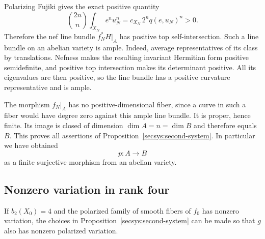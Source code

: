 Polarizing Fujiki gives the exact positive quantity
\begin{equation}\label{secsys:mixed-fujiki}
 \binom{2n}{n}\int_{X_N}e^n u_N^n
       =c_{X_N}\,2^n q(e,u_N)^n>0.
\end{equation}
Therefore the nef line bundle $f_N^*H|_A$ has positive top
self-intersection.  Such a line bundle on an abelian variety is ample.
Indeed, average representatives of its class by translations.  Nefness
makes the resulting invariant Hermitian form positive semidefinite,
and positive top intersection makes its determinant positive.  All
its eigenvalues are then positive, so the line bundle has a positive
curvature representative and is ample.

The morphism $f_N|_A$ has no positive-dimensional fiber, since a curve
in such a fiber would have degree zero against this ample line bundle.
It is proper, hence finite.  Its image is closed of dimension
$\dim A=n=\dim B$ and therefore equals $B$.  This proves all assertions
of Proposition~\ref{secsys:second-system}.  In particular we have obtained
\begin{equation}\label{secsys:abelian-cover}
                         p:A\longrightarrow B
\end{equation}
as a finite surjective morphism from an abelian variety.

\subsection{Nonzero variation in rank four}

\begin{proposition}
\label{secsys:rank-four-variation}
If $b_2(X_0)=4$ and the polarized family of smooth fibers of $f_0$
has nonzero variation, the choices in
Proposition~\ref{secsys:second-system} can be made so that $g$ also
has nonzero polarized variation.
\end{proposition}

